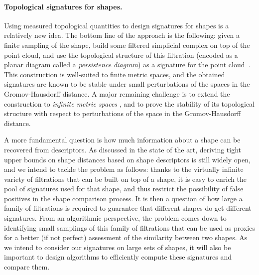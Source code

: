 \paragraph{Topological signatures for shapes.}


Using measured topological quantities to design signatures for shapes
is a relatively new idea. The bottom line of the approach is the
following: given a finite sampling of the shape, build some filtered
simplicial complex on top of the point cloud, and use the topological
structure of this filtration (encoded as a planar diagram called a
{\em persistence diagram}) as a signature for the point
cloud~\cite{ccgmo-ghsssp-09, socg-pbsds-10}. This construction is
well-suited to finite metric spaces, and the obtained signatures are
known to be stable under small perturbations of the spaces in the
Gromov-Hausdorff distance.  
A major remaining challenge is to extend the
construction to {\em infinite metric spaces} , and to prove the stability of
its topological structure with respect to perturbations of the space
in the Gromov-Hausdorff distance.

A more fundamental question is how much information about a shape can
be recovered from descriptors. As discussed in the state of the art,
deriving tight upper bounds on shape distances based on shape descriptors is
still widely open, and we intend to tackle the problem as
follows: thanks to the virtually infinite variety of filtrations that
can be built on top of a shape, it is easy to enrich the pool of
signatures used for that shape, and thus restrict the possibility of
false positives in the shape comparison process. It is then a question
of how large a family of filtrations is required to guarantee that
different shapes do get different signatures. From an algorithmic
perspective, the problem comes down to identifying small samplings of this
family of filtrations that can be used as proxies for a better (if not
perfect) assessment of the similarity between two shapes.  As we
intend to consider our signatures on large sets of shapes, it will
also be important to design algorithms to efficiently compute these
signatures and compare them.%


